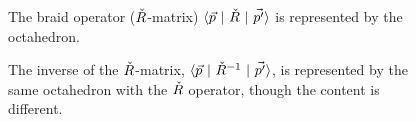 \documentclass[12pt]{article}
\numberwithin{equation}{section}
\begin{document}
\begin{figure}[htbp]
  \begin{center}
    \begin{psfrags}
    \end{psfrags}
    \caption{The braid operator ($\Check{R}$-matrix)
      $\langle \vec{p}  \ | \  \Check{R}  \ | \ \vec{p^\prime} \rangle$
      is represented by the octahedron.}
    \label{fig:R_matrix}
  \end{center}
\end{figure}

\begin{figure}[htbp]
  \begin{center}
    \begin{psfrags}
    \end{psfrags}
    \caption{The inverse of the  $\Check{R}$-matrix,
      $\langle \vec{p} \  | \  \Check{R}^{-1} \ | \  \vec{p^\prime} \rangle$,
      is represented by the same  octahedron with the $\Check{R}$
      operator, though the content is different.}
    \label{fig:R_inverse}
  \end{center}
\end{figure}
\end{document}
